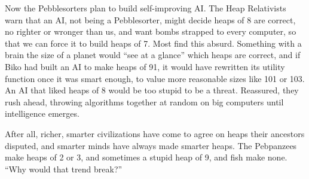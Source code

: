 Now the Pebblesorters plan to build self-improving AI. The Heap Relativists warn that an AI, not being a Pebblesorter, might decide heaps of 8 are correct, no righter or wronger than us, and want bombs strapped to every computer, so that we can force it to build heaps of 7. Most find this absurd. Something with a brain the size of a planet would ``see at a glance'' which heaps are correct, and if Biko had built an AI to make heaps of 91, it would have rewritten its utility function once it was smart enough, to value more reasonable sizes like 101 or 103.  An AI that liked heaps of 8 would be too stupid to be a threat. Reassured, they rush ahead, throwing algorithms together at random on big computers until intelligence emerges.

After all, richer, smarter civilizations have come to agree on heaps their ancestors disputed, and smarter minds have always made smarter heaps. The Pebpanzees make heaps of 2 or 3, and sometimes a stupid heap of 9, and fish make none. ``Why would that trend break?'' 
